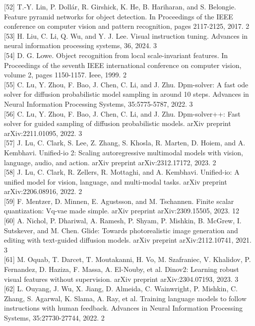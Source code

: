 \documentclass{article}
\begin{document}
[52] T.-Y. Lin, P. Dollár, R. Girshick, K. He, B. Hariharan, and S. Belongie. Feature pyramid networks for object detection. In Proceedings of the IEEE conference on computer vision and pattern recognition, pages 2117-2125, 2017. 2\\[0pt]
[53] H. Liu, C. Li, Q. Wu, and Y. J. Lee. Visual instruction tuning. Advances in neural information processing systems, 36, 2024. 3\\[0pt]
[54] D. G. Lowe. Object recognition from local scale-invariant features. In Proceedings of the seventh IEEE international conference on computer vision, volume 2, pages 1150-1157. Ieee, 1999. 2\\[0pt]
[55] C. Lu, Y. Zhou, F. Bao, J. Chen, C. Li, and J. Zhu. Dpm-solver: A fast ode solver for diffusion probabilistic model sampling in around 10 steps. Advances in Neural Information Processing Systems, 35:5775-5787, 2022. 3\\[0pt]
[56] C. Lu, Y. Zhou, F. Bao, J. Chen, C. Li, and J. Zhu. Dpm-solver++: Fast solver for guided sampling of diffusion probabilistic models. arXiv preprint arXiv:2211.01095, 2022. 3\\[0pt]
[57] J. Lu, C. Clark, S. Lee, Z. Zhang, S. Khosla, R. Marten, D. Hoiem, and A. Kembhavi. Unified-io 2: Scaling autoregressive multimodal models with vision, language, audio, and action. arXiv preprint arXiv:2312.17172, 2023. 2\\[0pt]
[58] J. Lu, C. Clark, R. Zellers, R. Mottaghi, and A. Kembhavi. Unified-io: A unified model for vision, language, and multi-modal tasks. arXiv preprint arXiv:2206.08916, 2022. 2\\[0pt]
[59] F. Mentzer, D. Minnen, E. Agustsson, and M. Tschannen. Finite scalar quantization: Vq-vae made simple. arXiv preprint arXiv:2309.15505, 2023. 12\\[0pt]
[60] A. Nichol, P. Dhariwal, A. Ramesh, P. Shyam, P. Mishkin, B. McGrew, I. Sutskever, and M. Chen. Glide: Towards photorealistic image generation and editing with text-guided diffusion models. arXiv preprint arXiv:2112.10741, 2021. 3\\[0pt]
[61] M. Oquab, T. Darcet, T. Moutakanni, H. Vo, M. Szafraniec, V. Khalidov, P. Fernandez, D. Haziza, F. Massa, A. El-Nouby, et al. Dinov2: Learning robust visual features without supervision. arXiv preprint arXiv:2304.07193, 2023. 3\\[0pt]
[62] L. Ouyang, J. Wu, X. Jiang, D. Almeida, C. Wainwright, P. Mishkin, C. Zhang, S. Agarwal, K. Slama, A. Ray, et al. Training language models to follow instructions with human feedback. Advances in Neural Information Processing Systems, 35:27730-27744, 2022. 2\\[0pt]
\end{document}
